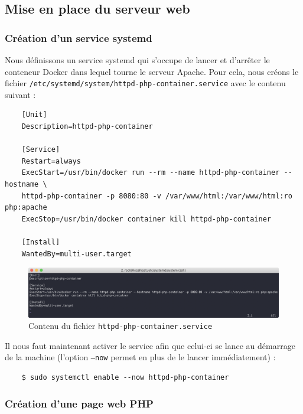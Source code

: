 \documentclass{extarticle} %
\begin{document}
    \subsection{Mise en place du serveur web}
    \subsubsection{Création d'un service systemd}

    Nous définissons un service systemd qui s'occupe de lancer et d'arrêter le conteneur Docker dans lequel
    tourne le serveur Apache. Pour cela, nous créons le fichier \texttt{/etc/systemd/system/httpd-php-container.service} avec le contenu suivant :

    \begin{verbatim}
    [Unit]
    Description=httpd-php-container

    [Service]
    Restart=always
    ExecStart=/usr/bin/docker run --rm --name httpd-php-container --hostname \
    httpd-php-container -p 8080:80 -v /var/www/html:/var/www/html:ro php:apache
    ExecStop=/usr/bin/docker container kill httpd-php-container

    [Install]
    WantedBy=multi-user.target
    \end{verbatim}

    \begin{figure}[H]
      \centering
      \includegraphics[scale=0.45]{img/systemd.png}
      \caption{Contenu du fichier \texttt{httpd-php-container.service}}
    \end{figure}

    Il nous faut maintenant activer le service afin que celui-ci se lance au démarrage 
    de la machine (l'option \texttt{--now} permet en plus de le lancer immédiatement) :

    \begin{verbatim}
    $ sudo systemctl enable --now httpd-php-container
    \end{verbatim}

    \subsubsection{Création d'une page web PHP}
\end{document}
